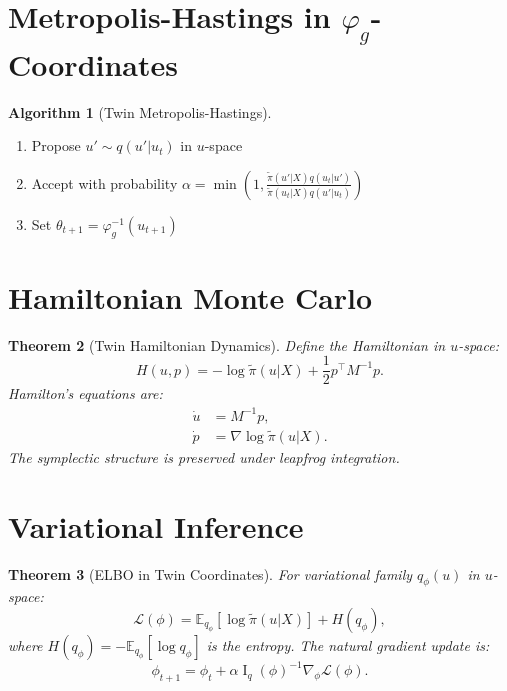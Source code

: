 \documentclass[11pt,twoside]{book}
\theoremstyle{plain}
\newtheorem{theorem}{Theorem}[chapter]
\theoremstyle{definition}
\newtheorem{algorithm_def}[theorem]{Algorithm}
\theoremstyle{remark}
\newcommand{\E}{\mathbb{E}}
\DeclareMathOperator{\Fisher}{I}
\begin{document}
\section{Metropolis-Hastings in $\varphi_g$-Coordinates}
\label{sec:mh_twin}

\begin{algorithm_def}[Twin Metropolis-Hastings]
    \begin{enumerate}
        \item Propose $u' \sim q(u' | u_t)$ in $u$-space
        \item Accept with probability $\alpha = \min\left(1, \frac{\tilde{\pi}(u' | X) q(u_t | u')}{\tilde{\pi}(u_t | X) q(u' | u_t)}\right)$
        \item Set $\theta_{t+1} = \varphi_g^{-1}(u_{t+1})$
    \end{enumerate}
\end{algorithm_def}

\section{Hamiltonian Monte Carlo}
\label{sec:hmc}

\begin{theorem}[Twin Hamiltonian Dynamics]
    Define the Hamiltonian in $u$-space:
    \[
    H(u, p) = -\log \tilde{\pi}(u | X) + \frac{1}{2}p^\top M^{-1} p.
    \]
    Hamilton's equations are:
    \begin{align}
        \dot{u} &= M^{-1} p, \\
        \dot{p} &= \nabla \log \tilde{\pi}(u | X).
    \end{align}
    The symplectic structure is preserved under leapfrog integration.
\end{theorem}

\section{Variational Inference}
\label{sec:vi}

\begin{theorem}[ELBO in Twin Coordinates]
    For variational family $q_\phi(u)$ in $u$-space:
    \[
    \mathcal{L}(\phi) = \E_{q_\phi}[\log \tilde{\pi}(u | X)] + H(q_\phi),
    \]
    where $H(q_\phi) = -\E_{q_\phi}[\log q_\phi]$ is the entropy. The natural gradient update is:
    \[
    \phi_{t+1} = \phi_t + \alpha \Fisher_{q}(\phi)^{-1} \nabla_\phi \mathcal{L}(\phi).
    \]
\end{theorem}
\end{document}
